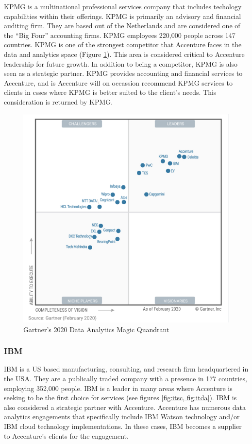 KPMG is a multinational professional services company that includes techology capabilities within their offerings. KPMG is primarily an advisory and financial auditing firm. They are based out of the Netherlands and are considered one of the ``Big Four'' accounting firms. KPMG employees 220,000 people across 147 countries. KPMG is one of the strongest competitor that Accenture faces in the data and analytics space (Figure \ref{fig:itda}). This area is considered critical to Accenture leadership for future growth. In addition to being a competitor, KPMG is also seen as a strategic partner. KPMG provides accounting and financial services to Accenture, and is Accenture will on occassion recommend KPMG services to clients in csses where KPMG is better suited to the client's needs. This consideration is returned by KPMG.

\begin{figure}[h!]
  \includegraphics[width=\textwidth]{img/data_analytics}
  \caption{Gartner's 2020 Data Analytics Magic Quandrant}
  \label{fig:itda}
\end{figure}


\subsubsection{IBM}
IBM is a US based manufacturing, consulting, and research firm headquartered in the USA. They are a publically traded company with a presence in 177 countries, employing 352,000 people. IBM is a leader in many areas where Accenture is seeking to be the first choice for services (see figures \ref{fig:itsc, fig:itda}). IBM is also considered a strategic partner with Accenture. Accenture has numerous data analytics engagements that specifically include IBM Watson technology and/or IBM cloud technology implementations. In these cases, IBM becomes a supplier to Accenture's clients for the engagement.


